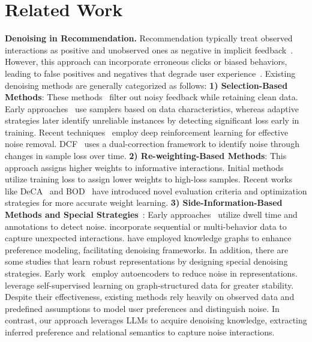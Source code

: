 \section{Related Work}
\textbf{Denoising in Recommendation.}
Recommendation typically treat observed interactions as positive and unobserved ones as negative in implicit feedback~\cite{ding2019sampler,gao2022self}. However, this approach can incorporate erroneous clicks or biased behaviors, leading to false positives and negatives that degrade user experience~\cite{sun2021does}. Existing denoising methods are generally categorized as follows:
\textbf{1) Selection-Based Methods}: These methods~\cite{gantner2012personalized,wen2019leveraging} filter out noisy feedback while retaining clean data. Early approaches~\cite{nguyen2019self,hu2008collaborative} use samplers based on data characteristics, whereas adaptive strategies later identify unreliable instances by detecting significant loss early in training. Recent techniques~\cite{lin2023autodenoise} employ deep reinforcement learning for effective noise removal. DCF~\cite{he2024double} uses a dual-correction framework to identify noise through changes in sample loss over time.
\textbf{2) Re-weighting-Based Methods}: This approach assigns higher weights to informative interactions. Initial methods~\cite{wang2022learning,wang2021implicit} utilize training loss to assign lower weights to high-loss samples. Recent works like DeCA~\cite{wang2022learning} and BOD~\cite{wang2023efficient} have introduced novel evaluation criteria and optimization strategies for more accurate weight learning.
\textbf{3) Side-Information-Based Methods and Special Strategies}~\cite{gao2022self,wu2021self,yang2021enhanced}: Early approaches~\cite{buscher2009segment,fu2010towards,zhao2016gaze} utilize dwell time and annotations to detect noise. \cite{zhang2024ssdrec,han2024efficient,xin2023improving} incorporate sequential or multi-behavior data to capture unexpected interactions. \cite{zhu2023knowledge,wang2024unleashing} have employed knowledge graphs to enhance preference modeling, facilitating denoising frameworks. 
In addition, there are some studies that learn robust representations by designing special denoising strategies. Early work~\cite{wu2016collaborative,khawar2020learning,strub2015collaborative} employ autoencoders to reduce noise in representations. \cite{wu2021self,yu2022graph} leverage self-supervised learning on graph-structured data for greater stability. 
Despite their effectiveness, existing methods rely heavily on observed data and predefined assumptions to model user preferences and distinguish noise. In contrast, our approach leverages LLMs to acquire denoising knowledge, extracting inferred preference and relational semantics to capture noise interactions.

\vspace{-2mm}